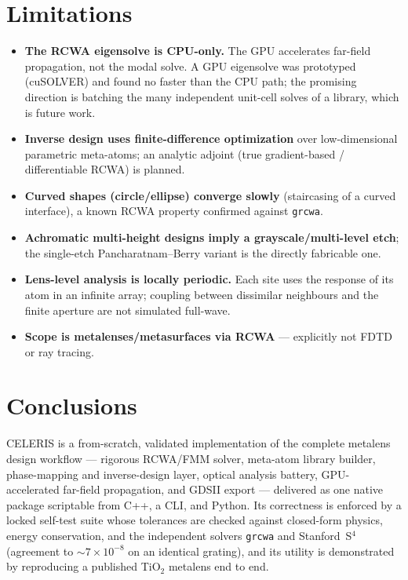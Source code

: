 \documentclass[preprint,12pt]{elsarticle}
\begin{document}
\section{Limitations}
\begin{itemize}
\item \textbf{The RCWA eigensolve is CPU-only.} The GPU accelerates far-field
      propagation, not the modal solve. A GPU eigensolve was prototyped (cuSOLVER) and
      found no faster than the CPU path; the promising direction is batching the many
      independent unit-cell solves of a library, which is future work.
\item \textbf{Inverse design uses finite-difference optimization} over low-dimensional
      parametric meta-atoms; an analytic adjoint (true gradient-based / differentiable
      RCWA) is planned.
\item \textbf{Curved shapes (circle/ellipse) converge slowly} (staircasing of a curved
      interface), a known RCWA property confirmed against \texttt{grcwa}.
\item \textbf{Achromatic multi-height designs imply a grayscale/multi-level etch}; the
      single-etch Pancharatnam--Berry variant is the directly fabricable one.
\item \textbf{Lens-level analysis is locally periodic.} Each site uses the response of
      its atom in an infinite array; coupling between dissimilar neighbours and the
      finite aperture are not simulated full-wave.
\item \textbf{Scope is metalenses/metasurfaces via RCWA} --- explicitly not FDTD or ray
      tracing.
\end{itemize}

\section{Conclusions}
CELERIS is a from-scratch, validated implementation of the complete metalens design
workflow --- rigorous RCWA/FMM solver, meta-atom library builder, phase-mapping and
inverse-design layer, optical analysis battery, GPU-accelerated far-field
propagation, and GDSII export --- delivered as one native package scriptable from
C++, a CLI, and Python. Its correctness is enforced by a locked self-test suite
whose tolerances are checked against closed-form physics, energy conservation, and
the independent solvers \texttt{grcwa} and Stanford~S$^4$ (agreement to
$\sim$$7\times10^{-8}$ on an identical grating), and its utility is demonstrated by
reproducing a published TiO$_2$ metalens end to end.
\end{document}
